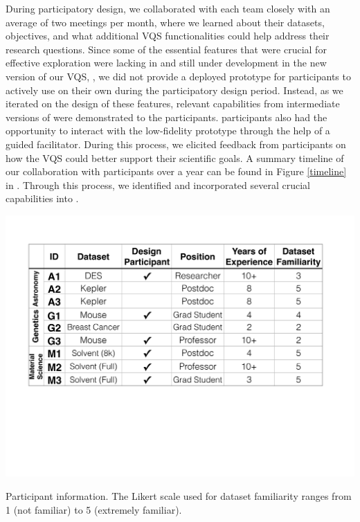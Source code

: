   \par {} During participatory design, we collaborated with each team closely with an average of two meetings per month, where we learned about their datasets, objectives, and what additional VQS functionalities could help address their research questions. Since some of the essential features that were crucial for effective exploration were lacking in \zv and still under development in the new version of our VQS, \zvpp, we did not provide a deployed prototype for participants to actively use on their own during the participatory design period. Instead, as we iterated on the design of these features, relevant capabilities from intermediate versions of \zvpp were demonstrated to the participants.  participants also had the opportunity to interact with the low-fidelity prototype through the help of a guided facilitator. %
  During this process, we elicited feedback from participants on how the VQS could better support their scientific goals. A summary timeline of our collaboration with participants over a year can be found in Figure \ref{timeline} in . %
  Through this process, we identified and incorporated several crucial capabilities into \zvpp{}. %
  \begin{table}[hb!]
    \centering
    \includegraphics[width=0.9\linewidth]{figures/participant_info.pdf}
    \caption{Participant information. The Likert scale used for dataset familiarity ranges from 1 (not familiar) to 5 (extremely familiar).}
    \label{participants}
    \vspace*{-10pt}
  \end{table}
